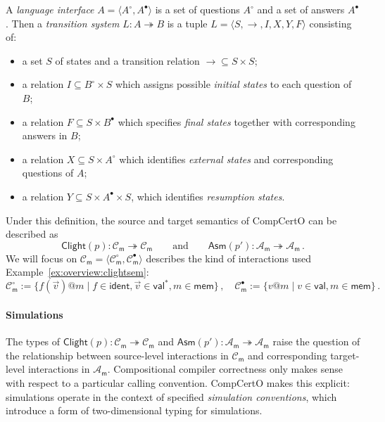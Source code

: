 \documentclass[acmsmall,screen,review,anonymous,nonacm]{acmart}
\newcommand{\kw}[1]{\ensuremath{ \mathsf{#1} }}
\newcommand{\que}{\circ}
\newcommand{\ans}{\bullet}
\begin{document}
\begin{definition} \label{def:li} \label{def:lts} %
A \emph{language interface} $A = \langle A^\que, A^\ans \rangle$
is a set of questions $A^\que$ and a set of answers $A^\ans$.
Then a \emph{transition system} $L : A \twoheadrightarrow B$
is a tuple $L = \langle S, {\rightarrow}, I, X, Y, F \rangle$
consisting of:
\begin{itemize}
  \item a set $S$ of states and
    a transition relation ${\rightarrow} \subseteq S \times S$;
  \item a relation $I \subseteq B^\que \times S$
    which assigns possible \emph{initial states}
    to each question of $B$;
  \item a relation $F \subseteq S \times B^\ans$
    which specifies \emph{final states} together with
    corresponding answers in $B$;
  \item a relation $X \subseteq S \times A^\que$
    which identifies \emph{external states} and
    corresponding questions of $A$;
  \item a relation $Y \subseteq S \times A^\ans \times S$,
    which identifies \emph{resumption states}.
\end{itemize}
\end{definition}

Under this definition,
the source and target semantics of CompCertO can be described as
\[
  \kw{Clight}(p) : \mathcal{C}_\kw{m} \twoheadrightarrow \mathcal{C}_\kw{m}
  \qquad \text{and} \qquad
  \kw{Asm}(p') : \mathcal{A}_\kw{m} \twoheadrightarrow \mathcal{A}_\kw{m} \,.
\]
We will focus on
$\mathcal{C}_\kw{m} = \langle \mathcal{C}_\kw{m}^\que, \mathcal{C}_\kw{m}^\ans \rangle$
describes the kind of interactions used Example~\ref{ex:overview:clightsem}:
\[
  \mathcal{C}_\kw{m}^\que :=
    \{ f(\vec{v})@m \mid f \in \kw{ident}, \vec{v} \in \kw{val}^*, m \in \kw{mem} \}
  \,,
  \quad
  \mathcal{C}_\kw{m}^\ans :=
    \{ v@m \mid v \in \kw{val}, m \in \kw{mem} \}
  \,.
\]


\paragraph{Simulations} %

The types of
$\kw{Clight}(p) : \mathcal{C}_\kw{m} \twoheadrightarrow \mathcal{C}_\kw{m}$ and
$\kw{Asm}(p') : \mathcal{A}_\kw{m} \twoheadrightarrow \mathcal{A}_\kw{m}$
raise the question of the relationship
between source-level interactions
in $\mathcal{C}_\kw{m}$
and corresponding target-level interactions
in $\mathcal{A}_\kw{m}$.
Compositional compiler correctness only makes sense
with respect to a particular calling convention.
%
CompCertO makes this explicit:
simulations operate in the context of specified
\emph{simulation conventions},
which introduce a form of two-dimensional typing for simulations.
\end{document}
